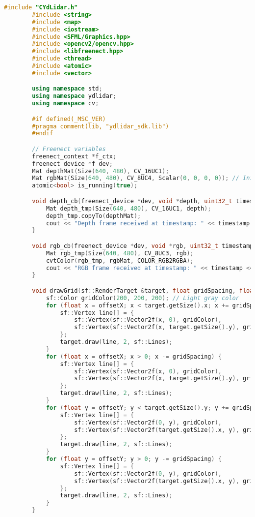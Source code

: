     \begin{lstlisting}[language={C++}, caption={C\'odigo de ejemplo de Kinect y LiDAR}, label={Script}]
        #include "CYdLidar.h"
        #include <string>
        #include <map>
        #include <iostream>
        #include <SFML/Graphics.hpp>
        #include <opencv2/opencv.hpp>
        #include <libfreenect.hpp>
        #include <thread>
        #include <atomic>
        #include <vector>

        using namespace std;
        using namespace ydlidar;
        using namespace cv;

        #if defined(_MSC_VER)
        #pragma comment(lib, "ydlidar_sdk.lib")
        #endif

        // Freenect variables
        freenect_context *f_ctx;
        freenect_device *f_dev;
        Mat depthMat(Size(640, 480), CV_16UC1);
        Mat rgbMat(Size(640, 480), CV_8UC4, Scalar(0, 0, 0, 0)); // Initialize with transparent
        atomic<bool> is_running(true);

        void depth_cb(freenect_device *dev, void *depth, uint32_t timestamp) {
            Mat depth_tmp(Size(640, 480), CV_16UC1, depth);
            depth_tmp.copyTo(depthMat);
            cout << "Depth frame received at timestamp: " << timestamp << endl;
        }

        void rgb_cb(freenect_device *dev, void *rgb, uint32_t timestamp) {
            Mat rgb_tmp(Size(640, 480), CV_8UC3, rgb);
            cvtColor(rgb_tmp, rgbMat, COLOR_RGB2RGBA);
            cout << "RGB frame received at timestamp: " << timestamp << endl;
        }

        void drawGrid(sf::RenderTarget &target, float gridSpacing, float offsetX, float offsetY) {
            sf::Color gridColor(200, 200, 200); // Light gray color
            for (float x = offsetX; x < target.getSize().x; x += gridSpacing) {
                sf::Vertex line[] = {
                    sf::Vertex(sf::Vector2f(x, 0), gridColor),
                    sf::Vertex(sf::Vector2f(x, target.getSize().y), gridColor)
                };
                target.draw(line, 2, sf::Lines);
            }
            for (float x = offsetX; x > 0; x -= gridSpacing) {
                sf::Vertex line[] = {
                    sf::Vertex(sf::Vector2f(x, 0), gridColor),
                    sf::Vertex(sf::Vector2f(x, target.getSize().y), gridColor)
                };
                target.draw(line, 2, sf::Lines);
            }
            for (float y = offsetY; y < target.getSize().y; y += gridSpacing) {
                sf::Vertex line[] = {
                    sf::Vertex(sf::Vector2f(0, y), gridColor),
                    sf::Vertex(sf::Vector2f(target.getSize().x, y), gridColor)
                };
                target.draw(line, 2, sf::Lines);
            }
            for (float y = offsetY; y > 0; y -= gridSpacing) {
                sf::Vertex line[] = {
                    sf::Vertex(sf::Vector2f(0, y), gridColor),
                    sf::Vertex(sf::Vector2f(target.getSize().x, y), gridColor)
                };
                target.draw(line, 2, sf::Lines);
            }
        }


\end{lstlisting}
